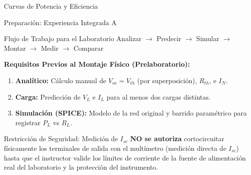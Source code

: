 \documentclass[aspectratio=169, table, xcdraw]{beamer}
\begin{document}
\begin{frame}{Curvas de Potencia y Eficiencia}
    \begin{center}
    \end{center}
\end{frame}

\begin{frame}{Preparación: Experiencia Integrada A}
    \begin{block}{Flujo de Trabajo para el Laboratorio}
        \centering
        Analizar $\rightarrow$ Predecir $\rightarrow$ Simular $\rightarrow$ Montar $\rightarrow$ Medir $\rightarrow$ Comparar
    \end{block}
    
    \textbf{Requisitos Previos al Montaje Físico (Prelaboratorio):}
    \begin{enumerate}
        \item \textbf{Analítico:} Cálculo manual de $V_{oc} = V_{th}$ (por superposición), $R_{th}$, e $I_N$.
        \item \textbf{Carga:} Predicción de $V_L$ e $I_L$ para al menos dos cargas distintas.
        \item \textbf{Simulación (SPICE):} Modelo de la red original y barrido paramétrico para registrar $P_L$ vs $R_L$.
    \end{enumerate}

    \begin{alertblock}{Restricción de Seguridad: Medición de $I_{sc}$}
        \textbf{NO se autoriza} cortocircuitar físicamente los terminales de salida con el multímetro (medición directa de $I_{sc}$) hasta que el instructor valide los límites de corriente de la fuente de alimentación real del laboratorio y la protección del instrumento.
    \end{alertblock}
\end{frame}
\end{document}
